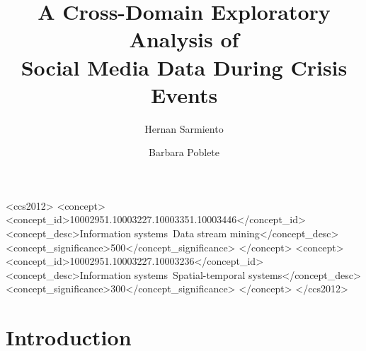 \documentclass[sigconf]{acmart}
\begin{document}
\title{A Cross-Domain Exploratory Analysis of \\ Social Media Data During Crisis Events}

 
 


\author{Hernan Sarmiento}

\author{Barbara Poblete}





\begin{abstract}

\end{abstract}




%
%
\begin{CCSXML}
	<ccs2012>
	<concept>
	<concept_id>10002951.10003227.10003351.10003446</concept_id>
	<concept_desc>Information systems~Data stream mining</concept_desc>
	<concept_significance>500</concept_significance>
	</concept>
	<concept>
	<concept_id>10002951.10003227.10003236</concept_id>
	<concept_desc>Information systems~Spatial-temporal systems</concept_desc>
	<concept_significance>300</concept_significance>
	</concept>
	</ccs2012>
\end{CCSXML}






\maketitle

\section{Introduction}
\end{document}
